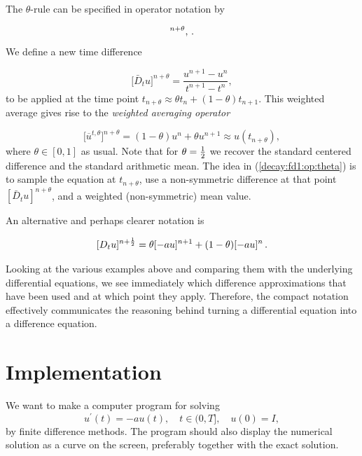 \documentclass[%
oneside,                 %
final,                   %
10pt]{article}
\begin{document}
The $\theta$-rule can be specified in operator notation by

\begin{equation}
[\bar D_t u = -a\overline{u}^{t,\theta}]^{n+\theta},\tp
\label{decay:fd1:op:theta}
\end{equation}
We define a new time difference

\begin{equation}
\lbrack\bar D_t u\rbrack^{n+\theta} = \frac{u^{n+1}-u^n}{t^{n+1}-t^n},
\label{decay:fd1:Du:theta}
\end{equation}
to be applied at the time point $t_{n+\theta}\approx\theta t_n + (1-\theta)t_{n+1}$. This weighted average gives rise to the
\emph{weighted averaging operator}

\begin{equation}
\lbrack\overline{u}^{t,\theta}\rbrack^{n+\theta} = (1-\theta)u^{n} + \theta u^{n+1}
\approx u(t_{n+\theta}),
\label{decay:fd1:wmean:a}
\end{equation}
where $\theta\in [0,1]$ as usual. Note that for $\theta =\frac{1}{2}$ we recover
the standard centered difference and the standard arithmetic mean.
The idea in (\ref{decay:fd1:op:theta}) is to sample the equation at
$t_{n+\theta}$, use a non-symmetric difference at that
point $[\bar D_t u]^{n+\theta}$, and a weighted (non-symmetric) mean value.

An alternative and perhaps clearer notation is

\[ [D_t u]^{n+\frac{1}{2}} = \theta [-au]^{n+1} + (1-\theta)[-au]^{n}\thinspace . \]

Looking at the various examples above and comparing them with the
underlying differential equations, we see immediately which difference
approximations that have been used and at which point they
apply. Therefore, the compact notation effectively communicates the
reasoning behind turning a differential equation into a difference
equation.


\section{Implementation}
\label{decay:impl1}

We want to make a computer program for solving
\[
u^{\prime}(t) = -au(t),\quad t\in (0,T], \quad u(0)=I,
\]
by finite difference methods. The program should also display
the numerical solution as a curve on the
screen, preferably together with the
exact solution.

 
\end{document}
